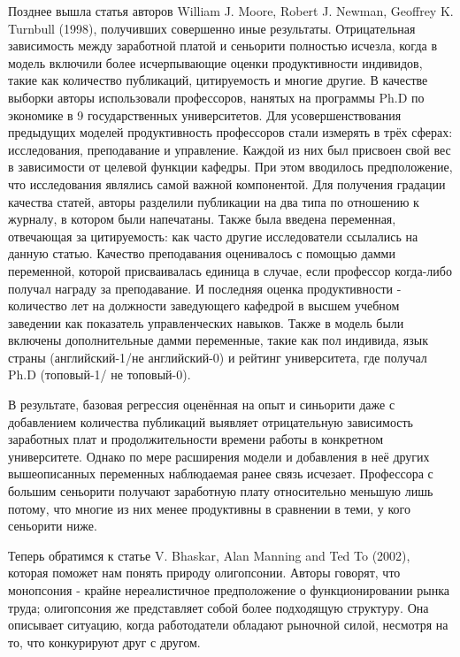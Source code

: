 \documentclass[a4paper, 12pt]{article}
\theoremstyle{definition}
\theoremstyle{plain}
\begin{document}
	Позднее вышла статья авторов William J. Moore, Robert J. Newman, Geoffrey K. Turnbull (1998), получивших совершенно иные результаты. Отрицательная зависимость  между заработной платой и сеньорити полностью исчезла, когда в модель включили более исчерпывающие оценки продуктивности индивидов, такие как количество публикаций, цитируемость и многие другие. В качестве выборки авторы использовали профессоров, нанятых на программы Ph.D по экономике в 9 государственных университетов. Для усовершенствования предыдущих моделей продуктивность профессоров стали измерять в трёх сферах: исследования, преподавание и управление. Каждой из них был присвоен свой вес в зависимости от целевой функции кафедры. При этом вводилось предположение, что  исследования являлись самой важной компонентой. Для получения градации качества статей, авторы разделили публикации на два типа по отношению к журналу, в котором были напечатаны. Также была введена переменная, отвечающая за цитируемость: как часто другие исследователи ссылались на данную статью. Качество преподавания оценивалось с помощью дамми переменной, которой присваивалась единица в случае, если профессор когда-либо получал награду за преподавание. И последняя оценка продуктивности - количество лет на должности заведующего кафедрой в высшем учебном заведении как показатель управленческих навыков. Также в модель были включены дополнительные дамми переменные, такие как пол индивида, язык страны (английский-1/не английский-0) и рейтинг университета, где получал Ph.D (топовый-1/ не топовый-0). 
	
	В результате, базовая регрессия оценённая на опыт и синьорити даже с добавлением количества публикаций выявляет отрицательную зависимость заработных плат и продолжительности времени работы в конкретном университете. Однако по мере расширения модели и добавления в неё других вышеописанных переменных наблюдаемая ранее связь исчезает. Профессора с большим сеньорити получают заработную плату относительно меньшую лишь потому, что многие из них менее продуктивны в сравнении в теми, у кого сеньорити ниже.
	
	Теперь обратимся к статье V. Bhaskar, Alan Manning and Ted To (2002), которая поможет нам понять природу олигопсонии. Авторы говорят,  что монопсония - крайне нереалистичное предположение о функционировании рынка труда; олигопсония же представляет собой более подходящую структуру. Она описывает ситуацию, когда работодатели обладают рыночной силой, несмотря на то, что конкурируют друг с другом. 
\end{document}
